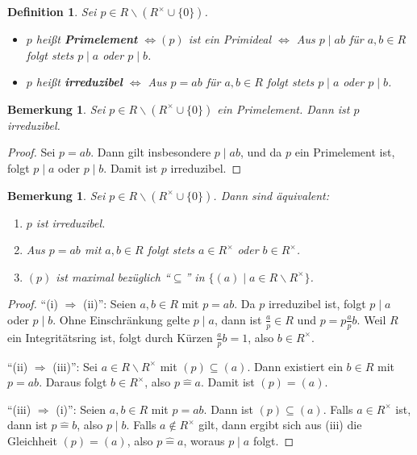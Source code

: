 \documentclass[a4paper, twoside, 11pt, ngerman]{report}
\renewcommand{\setminus}{\smallsetminus}
\newcommand{\assoc}{\mathrel{\widehat{=}}}
\theoremstyle{definistyle}
\newtheorem{defini}[satz]{Definition}
\newtheorem{bem}[satz]{Bemerkung}
\theoremstyle{remark}
\newcommand{\defn}[1]{\textit{\bfseries #1}}
\begin{document}
\begin{defini}\label{def:prime_irreduzibel}
Sei $p \in R \setminus (R^\times \cup \{0\})$.
\begin{itemize}
    \item $p$ heißt \defn{Primelement} $\iff (p)$ ist ein Primideal $\iff$ Aus $p \mid a b$ für $a, b \in R$ folgt stets $p \mid a$ oder $p \mid b$.
    \item $p$ heißt \defn{irreduzibel} $\iff$ Aus $p = a b$ für $a, b \in R$ folgt stets $p \mid a$ oder $p \mid b$.
\end{itemize}
\end{defini}

\begin{bem}\label{bem:primelement_irreduzibel}
Sei $p \in R \setminus (R^\times \cup \{0\})$ ein Primelement. Dann ist $p$ irreduzibel.
\end{bem}

\begin{proof}
Sei $p = a b$. Dann gilt insbesondere $p\mid ab$, und da $p$ ein Primelement ist, folgt $p \mid a$ oder $p \mid b$. Damit ist $p$ irreduzibel.
\end{proof}

\begin{bem}\label{bem:irreduzibel_eigenschaften}
Sei $p \in R \setminus (R^\times \cup \{0\})$. Dann sind äquivalent:
\begin{enumerate}[label=(\roman*)]
    \item $p$ ist irreduzibel.
    \item Aus $p = a b$ mit $a, b \in R$ folgt stets $a \in R^\times$ oder $b \in R^\times$.
    \item $(p)$ ist maximal bezüglich "`$\subseteq$"' in $\{(a) \mid a \in R \setminus R^\times\}$.  
\end{enumerate}
\end{bem}

\begin{proof}
"`(i) $\Rightarrow$ (ii)"': Seien $a, b \in R$ mit $p = a b$. Da $p$ irreduzibel ist, folgt $p \mid a$ oder $p \mid b$. Ohne Einschränkung gelte $p \mid a$, dann ist $\frac{a}{p}\in R$ und $p=p\frac{a}{p}b$. Weil $R$ ein Integritätsring ist, folgt durch Kürzen $\frac{a}{p} b = 1$, also $b \in R^\times$.

"`(ii) $\Rightarrow$ (iii)"': Sei $a \in R \setminus R^\times$ mit $(p) \subseteq (a)$. Dann existiert ein $b \in R$ mit $p = a b$. Daraus folgt $b \in R^\times$, also $p \assoc a$. Damit ist $(p) = (a)$.

"`(iii) $\Rightarrow$ (i)"': Seien $a, b \in R$ mit $p = a b$. Dann ist $(p) \subseteq (a)$. Falls $a \in R^\times$ ist, dann ist $p \assoc b$, also $p \mid b$. Falls $a \notin R^\times$ gilt, dann ergibt sich aus (iii) die Gleichheit $(p) = (a)$, also $p \assoc a$, woraus $p \mid a$ folgt.
\end{proof}
\end{document}
